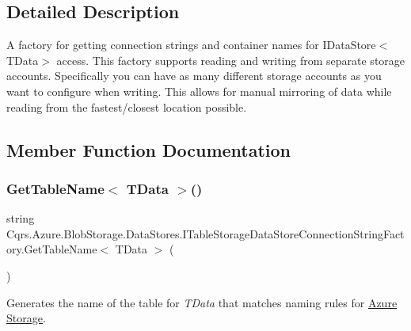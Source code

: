 \subsection{Detailed Description}
A factory for getting connection strings and container names for I\+Data\+Store$<$\+T\+Data$>$ access. This factory supports reading and writing from separate storage accounts. Specifically you can have as many different storage accounts as you want to configure when writing. This allows for manual mirroring of data while reading from the fastest/closest location possible. 



\subsection{Member Function Documentation}
\mbox{\label{interfaceCqrs_1_1Azure_1_1BlobStorage_1_1DataStores_1_1ITableStorageDataStoreConnectionStringFactory_a40ff0417d18d0cf9d0f59d6dfddfaa15_a40ff0417d18d0cf9d0f59d6dfddfaa15}} 
\subsubsection{\texorpdfstring{Get\+Table\+Name$<$ T\+Data $>$()}{GetTableName< TData >()}}
{\footnotesize\ttfamily string Cqrs.\+Azure.\+Blob\+Storage.\+Data\+Stores.\+I\+Table\+Storage\+Data\+Store\+Connection\+String\+Factory.\+Get\+Table\+Name$<$ T\+Data $>$ (\begin{DoxyParamCaption}{ }\end{DoxyParamCaption})}



Generates the name of the table for {\itshape T\+Data}  that matches naming rules for \hyperlink{namespaceCqrs_1_1Azure}{Azure} \hyperlink{namespaceCqrs_1_1Azure_1_1Storage}{Storage}. 



